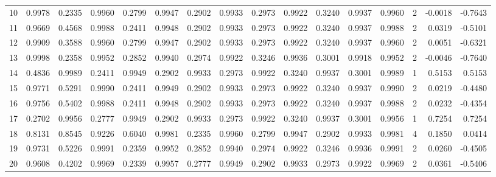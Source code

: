 \begin{tabular}{lrrrrrrrrrrrrrrr}
10  &      0.9978 &  0.2335 &  0.9960 &  0.2799 &  0.9947 &  0.2902 &  0.9933 &  0.2973 &  0.9922 &  0.3240 &   0.9937 &     0.9960 &      2 &                   -0.0018 &                    -0.7643 \\
11  &      0.9669 &  0.4568 &  0.9988 &  0.2411 &  0.9948 &  0.2902 &  0.9933 &  0.2973 &  0.9922 &  0.3240 &   0.9937 &     0.9988 &      2 &                    0.0319 &                    -0.5101 \\
12  &      0.9909 &  0.3588 &  0.9960 &  0.2799 &  0.9947 &  0.2902 &  0.9933 &  0.2973 &  0.9922 &  0.3240 &   0.9937 &     0.9960 &      2 &                    0.0051 &                    -0.6321 \\
13  &      0.9998 &  0.2358 &  0.9952 &  0.2852 &  0.9940 &  0.2974 &  0.9922 &  0.3246 &  0.9936 &  0.3001 &   0.9918 &     0.9952 &      2 &                   -0.0046 &                    -0.7640 \\
14  &      0.4836 &  0.9989 &  0.2411 &  0.9949 &  0.2902 &  0.9933 &  0.2973 &  0.9922 &  0.3240 &  0.9937 &   0.3001 &     0.9989 &      1 &                    0.5153 &                     0.5153 \\
15  &      0.9771 &  0.5291 &  0.9990 &  0.2411 &  0.9949 &  0.2902 &  0.9933 &  0.2973 &  0.9922 &  0.3240 &   0.9937 &     0.9990 &      2 &                    0.0219 &                    -0.4480 \\
16  &      0.9756 &  0.5402 &  0.9988 &  0.2411 &  0.9948 &  0.2902 &  0.9933 &  0.2973 &  0.9922 &  0.3240 &   0.9937 &     0.9988 &      2 &                    0.0232 &                    -0.4354 \\
17  &      0.2702 &  0.9956 &  0.2777 &  0.9949 &  0.2902 &  0.9933 &  0.2973 &  0.9922 &  0.3240 &  0.9937 &   0.3001 &     0.9956 &      1 &                    0.7254 &                     0.7254 \\
18  &      0.8131 &  0.8545 &  0.9226 &  0.6040 &  0.9981 &  0.2335 &  0.9960 &  0.2799 &  0.9947 &  0.2902 &   0.9933 &     0.9981 &      4 &                    0.1850 &                     0.0414 \\
19  &      0.9731 &  0.5226 &  0.9991 &  0.2359 &  0.9952 &  0.2852 &  0.9940 &  0.2974 &  0.9922 &  0.3246 &   0.9936 &     0.9991 &      2 &                    0.0260 &                    -0.4505 \\
20  &      0.9608 &  0.4202 &  0.9969 &  0.2339 &  0.9957 &  0.2777 &  0.9949 &  0.2902 &  0.9933 &  0.2973 &   0.9922 &     0.9969 &      2 &                    0.0361 &                    -0.5406 \\

\end{tabular}
